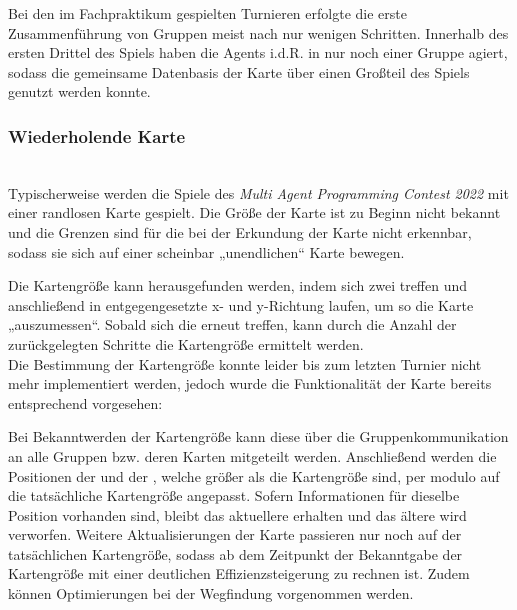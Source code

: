 Bei den im Fachpraktikum gespielten Turnieren erfolgte die erste Zusammenführung von Gruppen meist nach nur wenigen Schritten. Innerhalb des ersten Drittel des Spiels haben die Agents i.d.R. in nur noch einer Gruppe agiert, sodass die gemeinsame Datenbasis der Karte über einen Großteil des Spiels genutzt werden konnte. 

\subsubsection{Wiederholende Karte} ~\\
Typischerweise werden die Spiele des \textit{Multi Agent Programming Contest 2022} mit einer randlosen Karte gespielt. Die Größe der Karte ist zu Beginn nicht bekannt und die Grenzen sind für die \Agents bei der Erkundung der Karte nicht erkennbar, sodass sie sich auf einer scheinbar „unendlichen“ Karte bewegen.\newline

Die Kartengröße kann herausgefunden werden, indem sich zwei \Agents treffen und anschließend in entgegengesetzte x- und y-Richtung laufen, um so die Karte „auszumessen“. Sobald sich die \Agents erneut treffen, kann durch die Anzahl der zurückgelegten Schritte die Kartengröße ermittelt werden. \\ Die Bestimmung der Kartengröße konnte leider bis zum letzten Turnier nicht mehr implementiert werden, jedoch wurde die Funktionalität der Karte bereits entsprechend vorgesehen: \newline

Bei Bekanntwerden der Kartengröße kann diese über die Gruppenkommunikation an alle Gruppen bzw. deren Karten mitgeteilt werden. Anschließend werden die Positionen der \NextMapTiles und der \Agents, welche größer als die Kartengröße sind, per modulo auf die tatsächliche Kartengröße angepasst. Sofern Informationen für dieselbe Position vorhanden sind, bleibt das aktuellere \NextMapTile erhalten und das ältere wird verworfen. Weitere Aktualisierungen der Karte passieren nur noch auf der tatsächlichen Kartengröße, sodass ab dem Zeitpunkt der Bekanntgabe der Kartengröße mit einer deutlichen Effizienzsteigerung zu rechnen ist. Zudem können Optimierungen bei der Wegfindung vorgenommen werden.  

